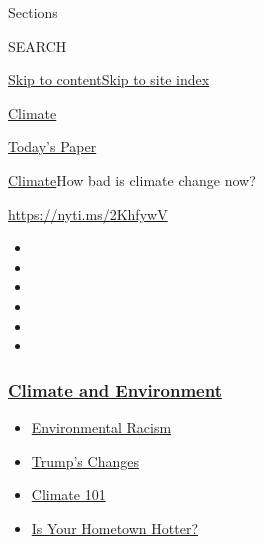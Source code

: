 Sections

SEARCH

\protect\hyperlink{site-content}{Skip to
content}\protect\hyperlink{site-index}{Skip to site index}

\href{https://www.nytimes3xbfgragh.onion/section/climate}{Climate}

\href{https://myaccount.nytimes3xbfgragh.onion/auth/login?response_type=cookie\&client_id=vi}{}

\href{https://www.nytimes3xbfgragh.onion/section/todayspaper}{Today's
Paper}

\href{/section/climate}{Climate}\textbar{}How bad is climate change now?

\url{https://nyti.ms/2KhfywV}

\begin{itemize}
\item
\item
\item
\item
\item
\item
\end{itemize}

\hypertarget{climate-and-environment}{%
\subsubsection{\texorpdfstring{\href{https://www.nytimes3xbfgragh.onion/section/climate?name=styln-climate\&region=TOP_BANNER\&block=storyline_menu_recirc\&action=click\&pgtype=Interactive\&impression_id=5a6bf990-f2cb-11ea-a43f-b1079632598a\&variant=undefined}{Climate
and
Environment}}{Climate and Environment}}\label{climate-and-environment}}

\begin{itemize}
\tightlist
\item
  \href{https://www.nytimes3xbfgragh.onion/interactive/2020/08/24/climate/racism-redlining-cities-global-warming.html?name=styln-climate\&region=TOP_BANNER\&block=storyline_menu_recirc\&action=click\&pgtype=Interactive\&impression_id=5a6bf991-f2cb-11ea-a43f-b1079632598a\&variant=undefined}{Environmental
  Racism}
\item
  \href{https://www.nytimes3xbfgragh.onion/interactive/2020/climate/trump-environment-rollbacks.html?name=styln-climate\&region=TOP_BANNER\&block=storyline_menu_recirc\&action=click\&pgtype=Interactive\&impression_id=5a6c20a0-f2cb-11ea-a43f-b1079632598a\&variant=undefined}{Trump's
  Changes}
\item
  \href{https://www.nytimes3xbfgragh.onion/interactive/2020/04/19/climate/climate-crash-course-1.html?name=styln-climate\&region=TOP_BANNER\&block=storyline_menu_recirc\&action=click\&pgtype=Interactive\&impression_id=5a6c20a1-f2cb-11ea-a43f-b1079632598a\&variant=undefined}{Climate
  101}
\item
  \href{https://www.nytimes3xbfgragh.onion/interactive/2018/08/30/climate/how-much-hotter-is-your-hometown.html?name=styln-climate\&region=TOP_BANNER\&block=storyline_menu_recirc\&action=click\&pgtype=Interactive\&impression_id=5a6c20a2-f2cb-11ea-a43f-b1079632598a\&variant=undefined}{Is
  Your Hometown Hotter?}
\end{itemize}

